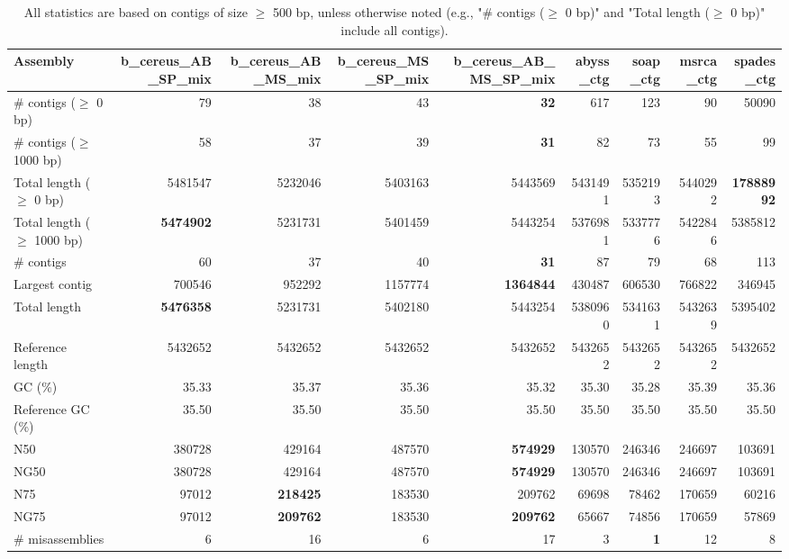 \documentclass[12pt,a4paper]{article}
\begin{document}
\begin{table}[ht]
\begin{center}
\caption{All statistics are based on contigs of size $\geq$ 500 bp, unless otherwise noted (e.g., "\# contigs ($\geq$ 0 bp)" and "Total length ($\geq$ 0 bp)" include all contigs).}
\begin{tabular}{|l*{8}{|r}|}
\hline
Assembly & b\_cereus\_AB\_SP\_mix & b\_cereus\_AB\_MS\_mix & b\_cereus\_MS\_SP\_mix & b\_cereus\_AB\_MS\_SP\_mix & abyss\_ctg & soap\_ctg & msrca\_ctg & spades\_ctg \\ \hline
\# contigs ($\geq$ 0 bp) & 79 & 38 & 43 & {\bf 32} & 617 & 123 & 90 & 50090 \\ \hline
\# contigs ($\geq$ 1000 bp) & 58 & 37 & 39 & {\bf 31} & 82 & 73 & 55 & 99 \\ \hline
Total length ($\geq$ 0 bp) & 5481547 & 5232046 & 5403163 & 5443569 & 5431491 & 5352193 & 5440292 & {\bf 17888992} \\ \hline
Total length ($\geq$ 1000 bp) & {\bf 5474902} & 5231731 & 5401459 & 5443254 & 5376981 & 5337776 & 5422846 & 5385812 \\ \hline
\# contigs & 60 & 37 & 40 & {\bf 31} & 87 & 79 & 68 & 113 \\ \hline
Largest contig & 700546 & 952292 & 1157774 & {\bf 1364844} & 430487 & 606530 & 766822 & 346945 \\ \hline
Total length & {\bf 5476358} & 5231731 & 5402180 & 5443254 & 5380960 & 5341631 & 5432639 & 5395402 \\ \hline
Reference length & 5432652 & 5432652 & 5432652 & 5432652 & 5432652 & 5432652 & 5432652 & 5432652 \\ \hline
GC (\%) & 35.33 & 35.37 & 35.36 & 35.32 & 35.30 & 35.28 & 35.39 & 35.36 \\ \hline
Reference GC (\%) & 35.50 & 35.50 & 35.50 & 35.50 & 35.50 & 35.50 & 35.50 & 35.50 \\ \hline
N50 & 380728 & 429164 & 487570 & {\bf 574929} & 130570 & 246346 & 246697 & 103691 \\ \hline
NG50 & 380728 & 429164 & 487570 & {\bf 574929} & 130570 & 246346 & 246697 & 103691 \\ \hline
N75 & 97012 & {\bf 218425} & 183530 & 209762 & 69698 & 78462 & 170659 & 60216 \\ \hline
NG75 & 97012 & {\bf 209762} & 183530 & {\bf 209762} & 65667 & 74856 & 170659 & 57869 \\ \hline
\# misassemblies & 6 & 16 & 6 & 17 & 3 & {\bf 1} & 12 & 8 \\ \hline

\end{tabular}
\end{center}
\end{table}
\end{document}
